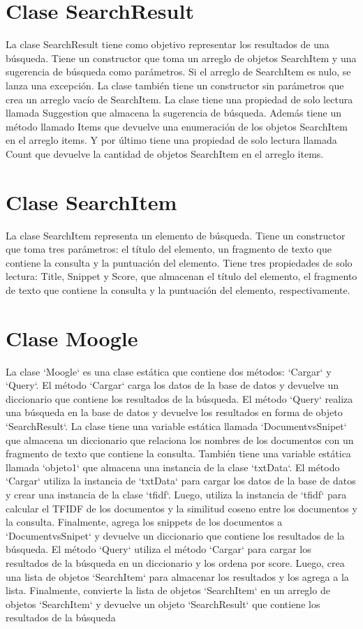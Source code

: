 \documentclass{article}
\begin{document}
\begin{center}
\section*{\textcolor{graphcolor}{{\centering Clase SearchResult}}}
La clase SearchResult tiene como objetivo representar los resultados de una búsqueda. 
Tiene un constructor que toma un arreglo de objetos SearchItem y una sugerencia de 
búsqueda como parámetros. Si el arreglo de SearchItem es nulo, se lanza una excepción.
La clase también tiene un constructor sin parámetros que crea un arreglo vacío de 
SearchItem.
La clase tiene una propiedad de solo lectura llamada Suggestion que almacena la 
sugerencia de búsqueda. Además tiene un método llamado Items que devuelve una 
enumeración de los objetos SearchItem en el arreglo items. Y por último tiene una 
propiedad de solo lectura llamada Count que devuelve la cantidad de objetos SearchItem 
en el arreglo items.


\section*{\textcolor{graphcolor}{{\centering Clase SearchItem}}}
La clase SearchItem representa un elemento de búsqueda. Tiene un constructor que toma
tres parámetros: el título del elemento, un fragmento de texto que contiene la consulta y la
puntuación del elemento. Tiene tres propiedades de solo lectura: Title, Snippet y Score, que almacenan el título del elemento, el fragmento de texto que contiene la consulta y la 
puntuación del elemento, respectivamente. 


\section*{\textcolor{graphcolor}{{\centering Clase Moogle}}}
La clase `Moogle` es una clase estática que contiene dos métodos: `Cargar` y `Query`. El 
método `Cargar` carga los datos de la base de datos y devuelve un diccionario que 
contiene los resultados de la búsqueda. El método `Query` realiza una búsqueda en la 
base de datos y devuelve los resultados en forma de objeto `SearchResult`. 
La clase tiene una variable estática llamada `DocumentvsSnipet` que almacena un 
diccionario que relaciona los nombres de los documentos con un fragmento de texto que 
contiene la consulta. También tiene una variable estática llamada `objeto1` que almacena 
una instancia de la clase `txtData`.
El método `Cargar` utiliza la instancia de `txtData` para cargar los datos de la base de 
datos y crear una instancia de la clase `tfidf`. Luego, utiliza la instancia de `tfidf` para 
calcular el TFIDF de los documentos y la similitud coseno entre los documentos y la 
consulta. Finalmente, agrega los snippets de los documentos a `DocumentvsSnipet` y 
devuelve un diccionario que contiene los resultados de la búsqueda.
El método `Query` utiliza el método `Cargar` para cargar los resultados de la búsqueda en
un diccionario y los ordena por score. Luego, crea una lista de objetos `SearchItem` para 
almacenar los resultados y los agrega a la lista. Finalmente, convierte la lista de objetos 
`SearchItem` en un arreglo de objetos `SearchItem` y devuelve un objeto `SearchResult` 
que contiene los resultados de la búsqueda


\end{center}
\end{document}
